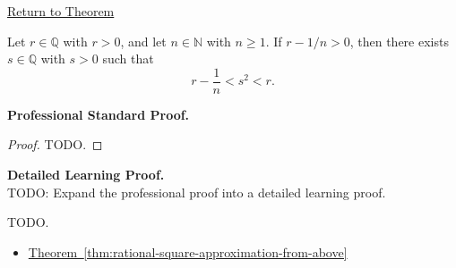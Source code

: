\newpage
{}
\label{prf:rational-square-approximation-from-below}

\begin{remark*}[Return]
\hyperref[thm:rational-square-approximation-from-below]{Return to Theorem}
\end{remark*}

\begin{theorem*}
Let $r\in\mathbb{Q}$ with $r>0$, and let $n\in\mathbb{N}$ with $n\ge 1$.
If $r-1/n>0$, then there exists $s\in\mathbb{Q}$ with $s>0$ such that
\[
r-\frac1n<s^2<r.
\]
\end{theorem*}

\textbf{Professional Standard Proof.}~\\
\begin{proof}
TODO.
\end{proof}

\textbf{Detailed Learning Proof.}~\\
TODO: Expand the professional proof into a detailed learning proof.


\begin{remark*}
TODO.
\end{remark*}

\begin{dependencies}
\begin{itemize}
  \item \hyperref[thm:rational-square-approximation-from-above]{Theorem~\ref*{thm:rational-square-approximation-from-above}}
\end{itemize}
\end{dependencies}
